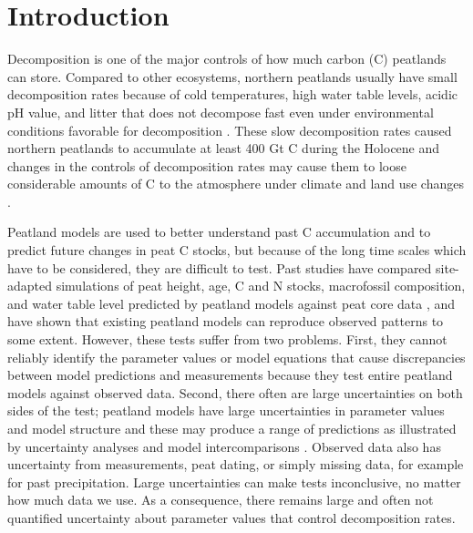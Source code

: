 \documentclass[esd, manuscript]{copernicus}
\begin{document}
\section{Introduction}

Decomposition is one of the major controls of how much carbon (C) peatlands can store. Compared to other ecosystems, northern peatlands usually have small decomposition rates because of cold temperatures, high water table levels, acidic pH value, and litter that does not decompose fast even under environmental conditions favorable for decomposition \citep{vanBreemen.1995, Rydin.2013}. These slow decomposition rates caused northern peatlands to accumulate at least 400 Gt C \citep{Yu.2012, Nichols.2019} during the Holocene and changes in the controls of decomposition rates may cause them to loose considerable amounts of C to the atmosphere under climate and land use changes \citep{Frolking.2011, Loisel.2017}.

Peatland models are used to better understand past C accumulation and to predict future changes in peat C stocks, but because of the long time scales which have to be considered, they are difficult to test. Past studies have compared site-adapted simulations of peat height, age, C and N stocks, macrofossil composition, and water table level predicted by peatland models against peat core data \citep[e.g.,][]{Frolking.2010, Tuittila.2013, Treat.2021, Zhao.2022}, and have shown that existing peatland models can reproduce observed patterns to some extent. However, these tests suffer from two problems. First, they cannot reliably identify the parameter values or model equations that cause discrepancies between model predictions and measurements because they test entire peatland models against observed data. Second, there often are large uncertainties on both sides of the test; peatland models have large uncertainties in parameter values and model structure and these may produce a range of predictions as illustrated by uncertainty analyses \citep[e.g.,][\citet{Quillet.2013a}]{Quillet.2013} and model intercomparisons \citep[e.g.,][]{Zhao.2022}. Observed data also has uncertainty from measurements, peat dating, or simply missing data, for example for past precipitation. Large uncertainties can make tests inconclusive, no matter how much data we use. As a consequence, there remains large and often not quantified uncertainty about parameter values that control decomposition rates.
\end{document}
